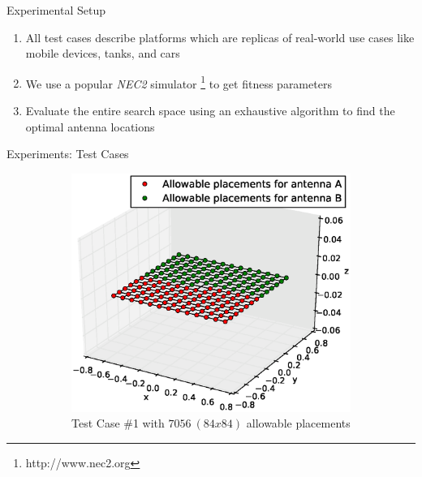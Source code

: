 \documentclass{beamer}
\begin{document}
\begin{frame}{Experimental Setup}
    \begin{enumerate}\itemsep1.5em
        \item All test cases describe platforms which are replicas of real-world use cases like mobile devices, tanks, and cars
        \item We use a popular \textit{NEC2} simulator \footnote{http://www.nec2.org} to get fitness parameters 
        \item Evaluate the entire search space using an exhaustive algorithm to find the optimal antenna locations
    \end{enumerate}
    \vspace{10mm}
\end{frame}


\begin{frame}{Experiments: Test Cases}
    \begin{figure}
        \centering
        \begin{subfigure}{.5\columnwidth}
            \includegraphics[width=\columnwidth,height=\columnwidth]{../paper/FIG/tc1_figure}%
            \caption*{\tiny Test Case \#1 with $7056~(84x84)$ allowable placements}%
        \end{subfigure}\hfill%
        \begin{subfigure}{.5\columnwidth}

\end{subfigure}
\end{figure}
\end{frame}
\end{document}
